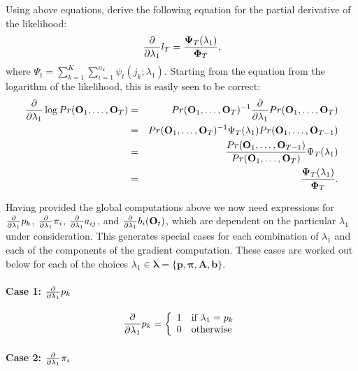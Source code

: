 \documentclass[a4paper,man,nobf]{apa}
\newcommand{\vc}{\mathbf}
\newcommand{\mat}{\mathbf}
\begin{document}
Using above equations, \cite{Lys2002} derive the following equation 
for the partial derivative of the likelihood:
\begin{equation}
	\frac{\partial} {\partial \lambda_{1}} l_{T}= 	
		\frac{\mathbf{\Psi}_{T}(\lambda_{1})}{\mathbf{\Phi}_{T}},
\end{equation}
where $\Psi_{t}=\sum_{k=1}^{K} \sum_{i=1}^{n_{k}} 
\psi_{t}(j_{k};\lambda_{1})$. 
Starting from the equation from the logarithm of the likelihood, this 
is easily seen to be correct: 
\begin{eqnarray}
	\fpp \log Pr(\vc{O}_{1}, \ldots, \vc{O}_{T}) &=& Pr(\vc{O}_{1}, 
\ldots, \vc{O}_{T})^{-1} 
	\fpp Pr(\vc{O}_{1}, \ldots, \vc{O}_{T}) \\
	&=& Pr(\vc{O}_{1}, \ldots, \vc{O}_{T})^{-1} \Psi_{T}(\lambda_{1}) 
Pr(\vc{O}_{1}, \ldots, \vc{O}_{T-1}) \\
	&=&  \frac{Pr(\vc{O}_{1}, \ldots, \vc{O}_{T-1})}{Pr(\vc{O}_{1}, 
\ldots, \vc{O}_{T})}  \Psi_{T} (\lambda_{1}) \\
	&=&  \frac{\mathbf{\Psi}_{T}(\lambda_{1})}{\mathbf{\Phi}_{T}}.
\end{eqnarray}


Having provided the global computations above we now need expressions 
for $\frac{\partial} {\partial \lambda_{1}} p_{k}$, $\frac{\partial} {\partial \lambda_{1}} \pi_{i}$, $\frac{\partial} {\partial \lambda_{1}} a_{ij}$, and $\fpp 
b_{i}(\vc{O}_{t})$, which are dependent on the particular 
$\lambda_{1}$ under consideration. This generates   special cases for 
each combination of $\lambda_{1}$ and each of the components of the 
gradient computation. These cases are worked out below for each of 
the choices $\lambda_{1} \in \pmb{\lambda}=\{ 
\vc{p},\pmb{\pi},\mat{A},\vc{b} \}$.


\paragraph{Case 1: $\frac{\partial} {\partial \lambda_{1}} p_{k}$}

\begin{align} 
        \frac{\partial} {\partial \lambda_{1}} p_{k} = \left\{ \begin{array}{ll} 
            1 & \mbox{if $\lambda_{1}=p_{k}$} \\ 
            0 & \mbox{otherwise} 
            \end{array} \right. 
\end{align} 


\paragraph{Case 2: $\frac{\partial} {\partial \lambda_{1}} \pi_{i}$ }
\end{document}
